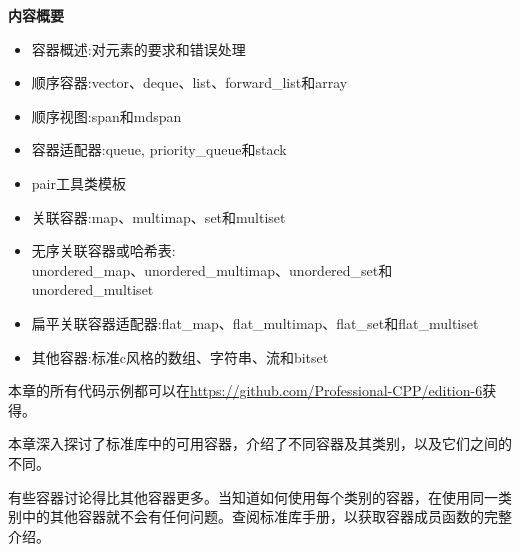 \noindent
\textbf{内容概要}

\begin{itemize}
\item
容器概述:对元素的要求和错误处理

\item
顺序容器:vector、deque、list、forward\_list和array

\item
顺序视图:span和mdspan

\item
容器适配器:queue, priority\_queue和stack

\item
pair工具类模板

\item
关联容器:map、multimap、set和multiset

\item
无序关联容器或哈希表:\\unordered\_map、unordered\_multimap、unordered\_set和unordered\_multiset

\item
扁平关联容器适配器:flat\_map、flat\_multimap、flat\_set和flat\_multiset

\item
其他容器:标准c风格的数组、字符串、流和bitset
\end{itemize}

本章的所有代码示例都可以在\url{https://github.com/Professional-CPP/edition-6}获得。

本章深入探讨了标准库中的可用容器，介绍了不同容器及其类别，以及它们之间的不同。

有些容器讨论得比其他容器更多。当知道如何使用每个类别的容器，在使用同一类别中的其他容器就不会有任何问题。查阅标准库手册，以获取容器成员函数的完整介绍。

